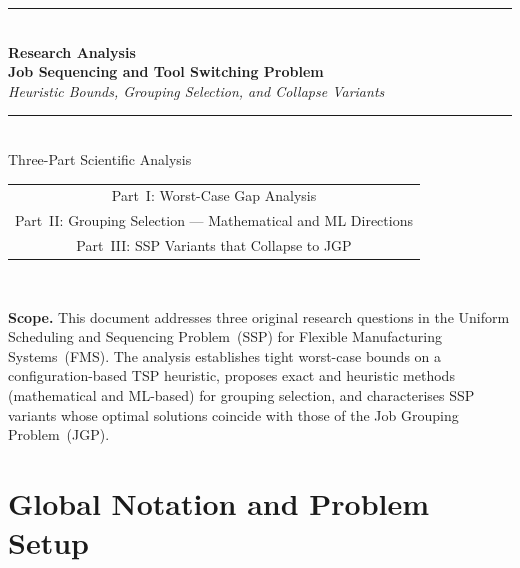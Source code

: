 \documentclass[11pt,a4paper]{article}
\theoremstyle{plain}
\theoremstyle{definition}
\begin{document}

\begin{titlepage}
\centering
\vspace*{2cm}
{\color{navyblue}\rule{\textwidth}{2pt}}\\[0.5cm]
{\Huge\bfseries\color{navyblue} Research Analysis}\\[0.4cm]
{\LARGE\bfseries\color{navyblue} Job Sequencing and Tool Switching Problem}\\[0.3cm]
{\Large\itshape\color{midblue} Heuristic Bounds, Grouping Selection, and Collapse Variants}\\[0.3cm]
{\color{navyblue}\rule{\textwidth}{2pt}}\\[1.5cm]
{\large Three-Part Scientific Analysis}\\[0.4cm]
{\normalsize
\begin{tabular}{c}
Part~I: Worst-Case Gap Analysis\\[2pt]
Part~II: Grouping Selection --- Mathematical and ML Directions\\[2pt]
Part~III: SSP Variants that Collapse to JGP
\end{tabular}
}\\[2cm]
\begin{mdframed}[backgroundcolor=lightblue,linecolor=navyblue,linewidth=1pt,
  innerleftmargin=20pt,innerrightmargin=20pt,innertopmargin=12pt,innerbottommargin=12pt]
\small\textbf{Scope.} This document addresses three original research questions in the
Uniform Scheduling and Sequencing Problem~(SSP) for Flexible Manufacturing Systems~(FMS).
The analysis establishes tight worst-case bounds on a configuration-based TSP heuristic,
proposes exact and heuristic methods (mathematical and ML-based) for grouping selection,
and characterises SSP variants whose optimal solutions coincide with those of the
Job Grouping Problem~(JGP).
\end{mdframed}
\vfill
\end{titlepage}

\tableofcontents
\newpage

\section{Global Notation and Problem Setup}
\label{sec:notation}
\end{document}

